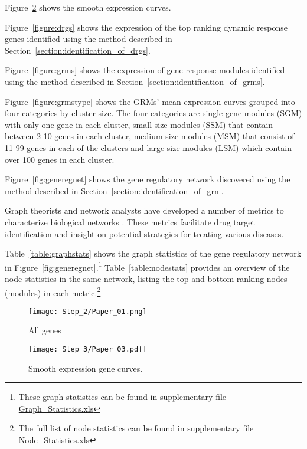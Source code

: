 

Figure~\ref{fig:smoothexp} shows the smooth expression curves.

Figure~\ref{figure:drgs} shows the expression of the top ranking dynamic response genes identified using the method described in Section~\ref{section:identification_of_drgs}.

Figure~\ref{figure:grms} shows the expression of gene response modules identified using the method described in Section~\ref{section:identification_of_grms}.

Figure~\ref{figure:grmstype} shows the GRMs' mean expression curves grouped into four categories by cluster size. The four categories are single-gene modules (SGM) with only one gene in each cluster, small-size modules (SSM) that contain between 2-10 genes in each cluster, medium-size modules (MSM) that consist of 11-99 genes in each of the clusters and large-size modules (LSM) which contain over 100 genes in each cluster.

Figure~\ref{fig:generegnet} shows the gene regulatory network discovered using the method described in Section~\ref{section:identification_of_grn}.

Graph theorists and network analysts have developed a number of metrics to characterize biological networks \cite{huber2007graphs, lee2004coexpression}. These metrics facilitate drug target identification and insight on potential strategies for treating various diseases.

Table~\ref{table:graphstats} shows the graph statistics of the gene regulatory network in Figure~\ref{fig:generegnet}.\footnote{These graph statistics can be found in supplementary file \href{Step_8/Graph\_Statistics.xls}{Graph\_Statistics.xls}} Table~\ref{table:nodestats} provides an overview of the node statistics in the same network, listing the top and bottom ranking nodes (modules) in each metric.\footnote{The full list of node statistics can be found in supplementary file \href{Step_8/Node\_Statistics.xls}{Node\_Statistics.xls}}

\begin{figure}
\centering
\texttt{[image: Step\_2/Paper\_01.png]}
\caption{All genes}
\label{fig:allgenes}
\end{figure}

\begin{figure}
\texttt{[image: Step\_3/Paper\_03.pdf]}
\caption{Smooth expression gene curves.}
\label{fig:smoothexp}
\end{figure}

